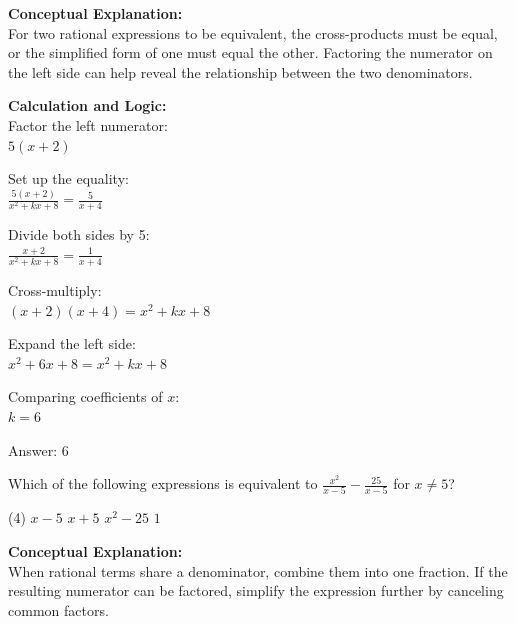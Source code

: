 \documentclass[11pt,paper=a4,answers]{exam}
\begin{document}
\begin{questions}
\begin{solution}
\textbf{Conceptual Explanation:} \\
For two rational expressions to be equivalent, the cross-products must be equal, or the simplified form of one must equal the other. Factoring the numerator on the left side can help reveal the relationship between the two denominators.

\vspace{20pt}

\textbf{Calculation and Logic:} \\
Factor the left numerator: \\
$5(x+2)$

\vspace{10pt}

Set up the equality: \\
$\frac{5(x+2)}{x^2 + kx + 8} = \frac{5}{x+4}$

\vspace{10pt}

Divide both sides by 5: \\
$\frac{x+2}{x^2 + kx + 8} = \frac{1}{x+4}$

\vspace{10pt}

Cross-multiply: \\
$(x+2)(x+4) = x^2 + kx + 8$

\vspace{10pt}

Expand the left side: \\
$x^2 + 6x + 8 = x^2 + kx + 8$

\vspace{10pt}

Comparing coefficients of $x$: \\
$k = 6$

\vspace{25pt}

Answer: \colorbox{yellow!100}{6}
\end{solution}

\question
Which of the following expressions is equivalent to $\frac{x^2}{x-5} - \frac{25}{x-5}$ for $x \neq 5$?
\begin{tasks}(4)
    \task $x-5$
    \task $x+5$
    \task $x^2-25$
    \task $1$
\end{tasks}

\begin{solution}
\textbf{Conceptual Explanation:} \\
When rational terms share a denominator, combine them into one fraction. If the resulting numerator can be factored, simplify the expression further by canceling common factors.


\end{solution}
\end{questions}
\end{document}
